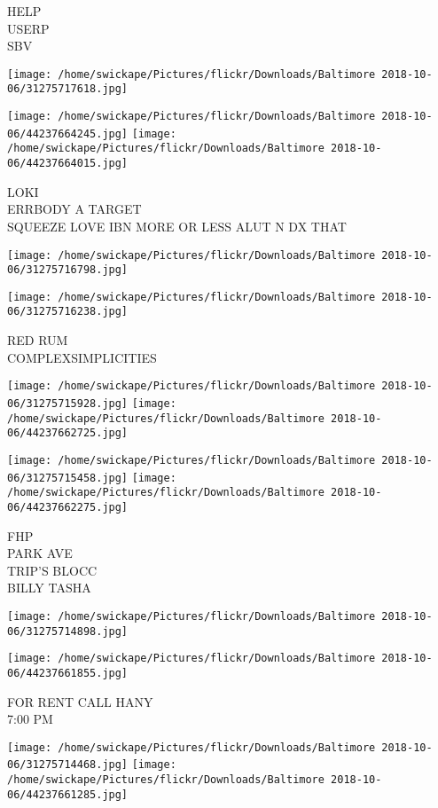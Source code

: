 \documentclass[10pt,letterpaper]{article}
\begin{document}
HELP\\
USERP\\
SBV
\pagebreak

\texttt{[image: /home/swickape/Pictures/flickr/Downloads/Baltimore 2018-10-06/31275717618.jpg]}

\vspace{0.25in}
\texttt{[image: /home/swickape/Pictures/flickr/Downloads/Baltimore 2018-10-06/44237664245.jpg]}
\texttt{[image: /home/swickape/Pictures/flickr/Downloads/Baltimore 2018-10-06/44237664015.jpg]}

LOKI\\
ERRBODY A TARGET\\
SQUEEZE LOVE IBN MORE OR LESS ALUT N DX THAT
\pagebreak

\texttt{[image: /home/swickape/Pictures/flickr/Downloads/Baltimore 2018-10-06/31275716798.jpg]}

\vspace{0.25in}
\texttt{[image: /home/swickape/Pictures/flickr/Downloads/Baltimore 2018-10-06/31275716238.jpg]}

RED RUM\\
COMPLEXSIMPLICITIES
\pagebreak

\texttt{[image: /home/swickape/Pictures/flickr/Downloads/Baltimore 2018-10-06/31275715928.jpg]}
\texttt{[image: /home/swickape/Pictures/flickr/Downloads/Baltimore 2018-10-06/44237662725.jpg]}

\texttt{[image: /home/swickape/Pictures/flickr/Downloads/Baltimore 2018-10-06/31275715458.jpg]}
\texttt{[image: /home/swickape/Pictures/flickr/Downloads/Baltimore 2018-10-06/44237662275.jpg]}

FHP\\
PARK AVE\\
TRIP'S BLOCC\\
BILLY TASHA
\pagebreak

\texttt{[image: /home/swickape/Pictures/flickr/Downloads/Baltimore 2018-10-06/31275714898.jpg]}

\vspace{0.25in}
\texttt{[image: /home/swickape/Pictures/flickr/Downloads/Baltimore 2018-10-06/44237661855.jpg]}

FOR RENT CALL HANY\\
7:00 PM
\pagebreak

\texttt{[image: /home/swickape/Pictures/flickr/Downloads/Baltimore 2018-10-06/31275714468.jpg]}
\texttt{[image: /home/swickape/Pictures/flickr/Downloads/Baltimore 2018-10-06/44237661285.jpg]}
\end{document}
